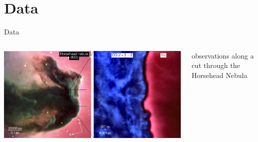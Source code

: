 \documentclass[10pt,dvipsnames,hyperref={colorlinks=false}]{beamer}
\begin{document}
\section{Data}
\begin{frame}{Data}
    \begin{columns}
        \begin{column}{.25\textwidth}
            \includegraphics[width=\textwidth,trim=100 0 225 0,clip,keepaspectratio]{horsehead_HernandezVera2023.pdf}
        \end{column}
        \begin{column}{.75\textwidth}
            observations along a cut through the Horsehead Nebula\par

\end{column}
\end{columns}
\end{frame}
\end{document}
